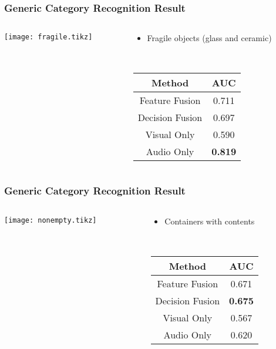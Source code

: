 \documentclass{beamer}
\begin{document}
\begin{frame}
  \frametitle{Generic Category Recognition Result}

  \begin{columns}
    \begin{column}{.6\linewidth}
      \centering
      \footnotesize
      \texttt{[image: fragile.tikz]}
    \end{column}
    \begin{column}{.4\linewidth}
      \begin{itemize}
        \item Fragile objects (glass and ceramic)
      \end{itemize}
      ~

      \footnotesize
      \begin{tabular}[h]{c|c}
        \hline
        Method & AUC \\ \hline \hline
        Feature Fusion & 0.711 \\ \hline
        Decision Fusion  & 0.697 \\ \hline
        Visual Only & 0.590 \\ \hline
        Audio Only & \textbf{0.819} \\ \hline
      \end{tabular}
    \end{column}
  \end{columns}
\end{frame}
\begin{frame}
  \frametitle{Generic Category Recognition Result}

  \begin{columns}
    \begin{column}{.6\linewidth}
      \centering
      \footnotesize
      \texttt{[image: nonempty.tikz]}
    \end{column}
    \begin{column}{.4\linewidth}
      \begin{itemize}
        \item Containers with contents
      \end{itemize}
      ~

      \footnotesize
      \begin{tabular}[h]{c|c}
        \hline
        Method & AUC \\ \hline \hline
        Feature Fusion & 0.671 \\ \hline
        Decision Fusion  & \textbf{0.675} \\ \hline
        Visual Only & 0.567 \\ \hline
        Audio Only & 0.620 \\ \hline
      \end{tabular}
    \end{column}
  \end{columns}
\end{frame}
\end{document}
